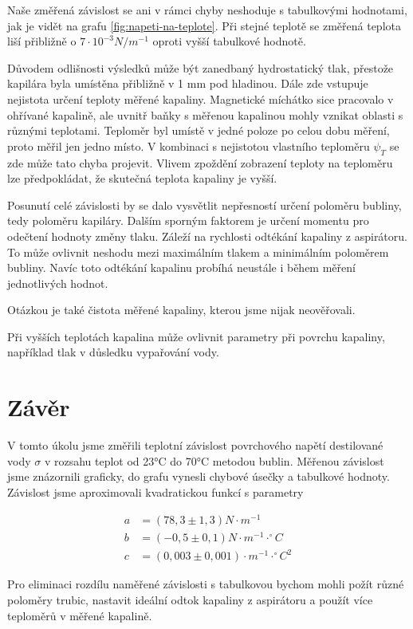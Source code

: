 Naše změřená závislost se ani v rámci chyby neshoduje s tabulkovými hodnotami, jak je vidět na grafu \ref{fig:napeti-na-teplote}. Při stejné teplotě se změřená teplota liší přibližně o $7 \cdot 10^{-3} N / m^{-1}$ oproti vyšší tabulkové hodnotě.

Důvodem odlišnosti výsledků může být zanedbaný hydrostatický tlak, přestože kapilára byla umístěna přibližně v 1 mm pod hladinou. Dále zde vstupuje nejistota určení teploty měřené kapaliny. Magnetické míchátko sice pracovalo v ohřívané kapalině, ale uvnitř baňky s měřenou kapalinou mohly vznikat oblasti s různými teplotami. Teploměr byl umístě v jedné poloze po celou dobu měření, proto měřil jen jedno místo. V kombinaci s nejistotou vlastního teploměru $\psi_T$ se zde může tato chyba projevit. Vlivem zpoždění zobrazení teploty na teploměru lze předpokládat, že skutečná teplota kapaliny je vyšší.

Posunutí celé závislosti by se dalo vysvětlit nepřesností určení poloměru bubliny, tedy poloměru kapiláry. Dalším sporným faktorem je určení momentu pro odečtení hodnoty změny tlaku. Záleží na rychlosti odtékání kapaliny z aspirátoru. To může ovlivnit neshodu mezi maximálním tlakem a minimálním poloměrem bubliny. Navíc toto odtékání kapalinu probíhá neustále i během měření jednotlivých hodnot.

Otázkou je také čistota měřené kapaliny, kterou jsme nijak neověřovali.

Při vyšších teplotách kapalina může ovlivnit parametry při povrchu kapaliny, například tlak v důsledku vypařování vody.

\section{Závěr}

V tomto úkolu jsme změřili teplotní závislost povrchového napětí destilované vody $\sigma$ v rozsahu teplot od 23°C do 70°C metodou bublin. Měřenou závislost jsme znázornili graficky, do grafu vynesli chybové úsečky a tabulkové hodnoty. Závislost jsme aproximovali kvadratickou funkcí s parametry

\begin{align*}
    a &= (78,3 \pm 1,3) N \cdot m^{-1}\\
    b &= (-0,5 \pm 0,1) N \cdot m^{-1} \cdot ^\circ C\\
    c &= (0,003 \pm 0,001) \cdot m^{-1} \cdot ^\circ C^2
\end{align*}

Pro eliminaci rozdílu naměřené závislosti s tabulkovou bychom mohli požít různé poloměry trubic, nastavit ideální odtok kapaliny z aspirátoru a použít více teploměrů v měřené kapalině.